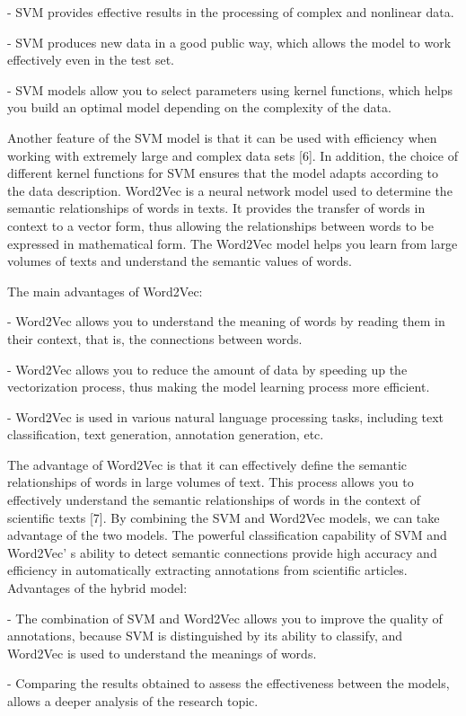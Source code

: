 \begin{multicols}{2}
- SVM provides effective results in the processing of complex and
nonlinear data.

- SVM produces new data in a good public way, which allows the model to
work effectively even in the test set.

- SVM models allow you to select parameters using kernel functions,
which helps you build an optimal model depending on the complexity of
the data.

Another feature of the SVM model is that it can be used with efficiency
when working with extremely large and complex data sets {[}6{]}. In
addition, the choice of different kernel functions for SVM ensures that
the model adapts according to the data description. Word2Vec is a neural
network model used to determine the semantic relationships of words in
texts. It provides the transfer of words in context to a vector form,
thus allowing the relationships between words to be expressed in
mathematical form. The Word2Vec model helps you learn from large volumes
of texts and understand the semantic values of words.

The main advantages of Word2Vec:

- Word2Vec allows you to understand the meaning of words by reading them
in their context, that is, the connections between words.

- Word2Vec allows you to reduce the amount of data by speeding up the
vectorization process, thus making the model learning process more
efficient.

- Word2Vec is used in various natural language processing tasks,
including text classification, text generation, annotation generation,
etc.

The advantage of Word2Vec is that it can effectively define the semantic
relationships of words in large volumes of text. This process allows you
to effectively understand the semantic relationships of words in the
context of scientific texts {[}7{]}. By combining the SVM and Word2Vec
models, we can take advantage of the two models. The powerful
classification capability of SVM and Word2Vec' s ability
to detect semantic connections provide high accuracy and efficiency in
automatically extracting annotations from scientific articles.
Advantages of the hybrid model:

- The combination of SVM and Word2Vec allows you to improve the quality
of annotations, because SVM is distinguished by its ability to classify,
and Word2Vec is used to understand the meanings of words.

- Comparing the results obtained to assess the effectiveness between the
models, allows a deeper analysis of the research topic.


\end{multicols}

